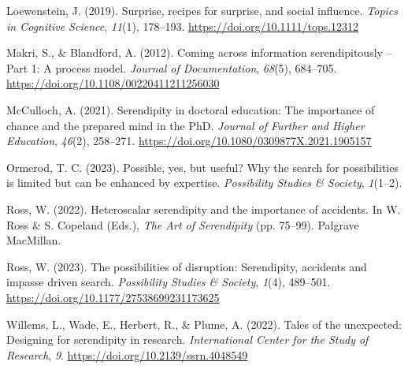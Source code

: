 \documentclass[authordate, commentary]{jote-new-article}
\begin{document}
	Loewenstein, J. (2019). Surprise, recipes for surprise, and social influence. \emph{Topics in Cognitive Science}, \emph{11}(1), 178--193. \url{https://doi.org/10.1111/tops.12312}



	Makri, S., \& Blandford, A. (2012). Coming across information serendipitously -- Part 1: A process model. \emph{Journal of Documentation}, \emph{68}(5), 684--705. \url{https://doi.org/10.1108/00220411211256030}



	McCulloch, A. (2021). Serendipity in doctoral education: The importance of chance and the prepared mind in the PhD. \emph{Journal of Further and Higher Education}, \emph{46}(2), 258--271. \url{https://doi.org/10.1080/0309877X.2021.1905157}



	Ormerod, T. C. (2023). Possible, yes, but useful? Why the search for possibilities is limited but can be enhanced by expertise. \emph{Possibility Studies \& Society}, \emph{1}(1--2).



	Ross, W. (2022). Heteroscalar serendipity and the importance of accidents. In W. Ross \& S. Copeland (Eds.), \emph{The Art of Serendipity} (pp. 75--99). Palgrave MacMillan.



	Ross, W. (2023). The possibilities of disruption: Serendipity, accidents and impasse driven search. \emph{Possibility Studies \& Society}, \emph{1}(4), 489--501. \url{https://doi.org/10.1177/27538699231173625}



	Willems, L., Wade, E., Herbert, R., \& Plume, A. (2022). Tales of the unexpected: Designing for serendipity in research. \emph{International Center for the Study of Research}, \emph{9}. \url{https://doi.org/10.2139/ssrn.4048549}
\end{document}
